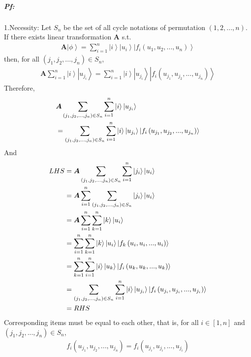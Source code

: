\documentclass[%
 reprint,
 amsmath,amssymb,
pra,
]{revtex4-1}
\begin{document}
\subparagraph{Pf:} 1.Necessity: Let $S_n$ be the set of all cycle notations of permutation $\left(1, 2, ..., n\right)$. If there exists linear transformation $\bm{A}$ s.t. 
\begin{align*}
	\bm{A}\left|\phi\right\rangle = \sum_{i=1}^n \left|i\right\rangle\left|u_i\right\rangle\left|f_{i}\left(u_1, u_2, ..., u_n\right)\right\rangle
\end{align*}
then, for all $\left(j_1, j_2, ..., j_n\right)\in S_n$, 
\begin{align*}
	\bm{A}\sum_{i=1}^n \left|i\right\rangle\left|u_{j_i}\right\rangle = \sum_{i=1}^n \left|i\right\rangle\left|u_{j_i}\right\rangle\left|f_{i}\left(u_{j_1}, u_{j_2}, ..., u_{j_n}\right)\right\rangle
\end{align*}
Therefore,  
\begin{align*}
	&\bm{A}\sum_{\left(j_1, j_2, ..., j_n\right)\in S_n}\sum_{i=1}^n \left|i\right\rangle\left|u_{j_i}\right\rangle \notag\\
	&=\sum_{\left(j_1, j_2, ..., j_n\right)\in S_n}\sum_{i=1}^n\left|i\right\rangle\left|u_{j_i}\right\rangle\left|f_{i}\left(u_{j_1}, u_{j_2}, ..., u_{j_n}\right)\right\rangle
\end{align*}
And
\begin{align*}
	LHS &= \bm{A}\sum_{\left(j_1, j_2, ..., j_n\right)\in S_n}\sum_{i=1}^n \left|j_i\right\rangle\left|u_i\right\rangle\notag\\
	&= \bm{A}\sum_{i=1}^n\sum_{\left(j_1, j_2, ..., j_n\right)\in S_n}\left|j_i\right\rangle\left|u_i\right\rangle\notag\\
	&= \bm{A}\sum_{i=1}^n\sum_{k=1}^n\left|k\right\rangle\left|u_i\right\rangle \notag\\
	&= \sum_{i=1}^n\sum_{k=1}^n\left|k\right\rangle\left|u_i\right\rangle\left|f_{k}\left(u_i, u_i, ..., u_i\right)\right\rangle\notag\\
	&= \sum_{k=1}^n\sum_{i=1}^n\left|i\right\rangle\left|u_k\right\rangle\left|f_{i}\left(u_k, u_k, ..., u_k\right)\right\rangle\notag \\
	&= \sum_{\left(j_1, j_2, ..., j_n\right)\in S_n}\sum_{i=1}^n\left|i\right\rangle\left|u_{j_i}\right\rangle\left|f_{i}\left(u_{j_i}, u_{j_i}, ..., u_{j_i}\right)\right\rangle\notag\\
	&= RHS
\end{align*}
Corresponding items must be equal to each other, that is, for all $i \in \left[1, n\right]$ and $\left(j_1, j_2, ..., j_n\right)\in S_n$, 
\begin{align*}
	f_{i}\left(u_{j_1}, u_{j_2}, ..., u_{j_n}\right) = f_{i}\left(u_{j_i}, u_{j_i}, ..., u_{j_i}\right)
\end{align*}
\end{document}
